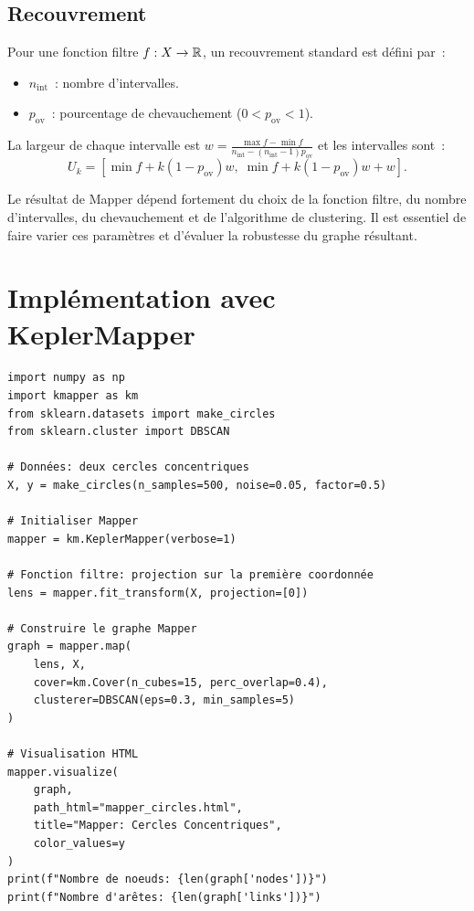 \subsection{Recouvrement}

\begin{definition}
Pour une fonction filtre $f : X \to \mathbb{R}$, un recouvrement standard est
d\'efini par~:
\begin{itemize}
  \item $n_{\mathrm{int}}$~: nombre d'intervalles.
  \item $p_{\mathrm{ov}}$~: pourcentage de chevauchement ($0 < p_{\mathrm{ov}} < 1$).
\end{itemize}
La largeur de chaque intervalle est
$w = \frac{\max f - \min f}{n_{\mathrm{int}} - (n_{\mathrm{int}} - 1) p_{\mathrm{ov}}}$
et les intervalles sont~:
\[
  U_k = [\min f + k(1 - p_{\mathrm{ov}})w,\;
         \min f + k(1 - p_{\mathrm{ov}})w + w].
\]
\end{definition}

\begin{attention}[title=\textbf{Sensibilit\'e aux param\`etres}]
Le r\'esultat de Mapper d\'epend fortement du choix de la fonction
filtre, du nombre d'intervalles, du chevauchement et de l'algorithme de
clustering. Il est essentiel de faire varier ces param\`etres et
d'\'evaluer la robustesse du graphe r\'esultant.
\end{attention}

\section{Impl\'ementation avec KeplerMapper}

\begin{codeblock}[title=\textbf{Mapper avec KeplerMapper}]
\begin{verbatim}
import numpy as np
import kmapper as km
from sklearn.datasets import make_circles
from sklearn.cluster import DBSCAN

# Données: deux cercles concentriques
X, y = make_circles(n_samples=500, noise=0.05, factor=0.5)

# Initialiser Mapper
mapper = km.KeplerMapper(verbose=1)

# Fonction filtre: projection sur la première coordonnée
lens = mapper.fit_transform(X, projection=[0])

# Construire le graphe Mapper
graph = mapper.map(
    lens, X,
    cover=km.Cover(n_cubes=15, perc_overlap=0.4),
    clusterer=DBSCAN(eps=0.3, min_samples=5)
)

# Visualisation HTML
mapper.visualize(
    graph,
    path_html="mapper_circles.html",
    title="Mapper: Cercles Concentriques",
    color_values=y
)
print(f"Nombre de noeuds: {len(graph['nodes'])}")
print(f"Nombre d'arêtes: {len(graph['links'])}")
\end{verbatim}
\end{codeblock}

